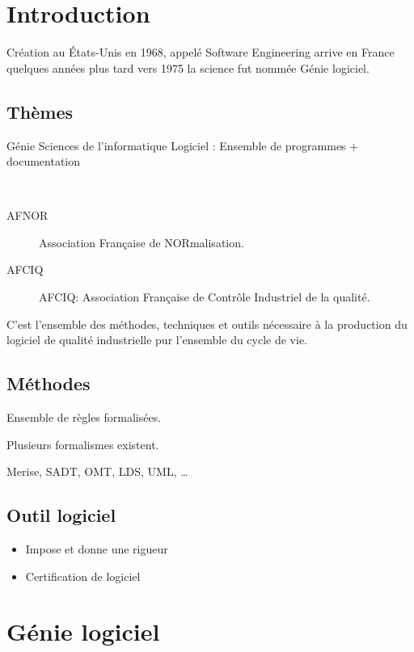 \documentclass[12pt,a4paper,openany]{book}
\begin{document}
	\thispagestyle{empty} %
	\titleBC 
	\dominitoc
	\setcounter{tocdepth}{1}
	\setcounter{secnumdepth}{3}
	\setcounter{minitocdepth}{1}
	\chapter{Introduction}
	Création au États-Unis en 1968, appelé Software Engineering arrive en
	France quelques années plus tard vers 1975 la science fut nommée Génie
	logiciel.

	\section{Thèmes}
	Génie Sciences de l'informatique
	Logiciel : Ensemble de programmes + documentation

\begin{definition}~
	\begin{description}
		\item[AFNOR] Association Française de NORmalisation.
		\item[AFCIQ] AFCIQ: Association Française de Contrôle Industriel de la qualité.
	\end{description}

	C'est l'ensemble des méthodes, techniques et outils nécessaire à la
	production du logiciel de qualité industrielle pur l'ensemble du cycle de
	vie.
\end{definition}

\section{Méthodes}
Ensemble de règles formalisées.

Plusieurs formalismes existent.
\begin{exemple}
	Merise, SADT, OMT, LDS, UML, \ldots
\end{exemple}

\section{Outil logiciel}
\begin{itemize}
	\item Impose et donne une rigueur
	\item Certification de logiciel
\end{itemize}
\chapter{Génie logiciel}
\end{document}
